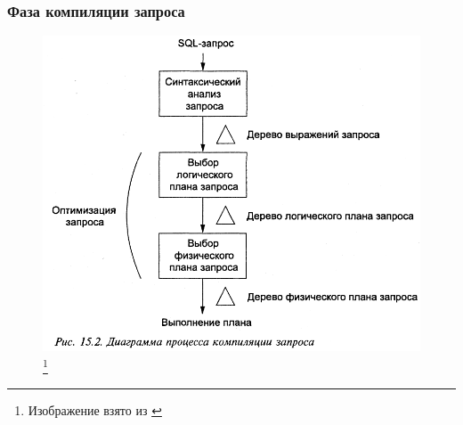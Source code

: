 \documentclass{beamer}
\begin{document}
\begin{frame}
\frametitle{Фаза компиляции запроса}

\begin{figure}[htb]
\includegraphics[width=\textwidth,height=0.8\textheight,keepaspectratio]{query-to-execution.png} 
\footnote{\tiny{Изображение взято из \cite{Ulman2004}}}
\end{figure}

\end{frame}

\end{document}
